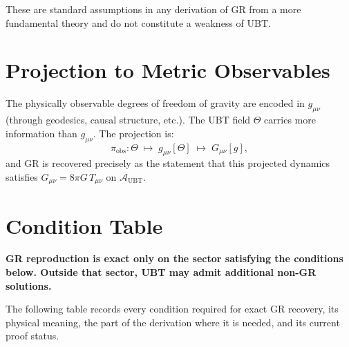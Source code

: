 \documentclass[12pt]{article}
\theoremstyle{definition}
\theoremstyle{remark}
\begin{document}
These are standard assumptions in any derivation of GR from a more
fundamental theory and do not constitute a weakness of UBT.

\section{Projection to Metric Observables}
\label{sec:projection}

The physically observable degrees of freedom of gravity are encoded in
$g_{\mu\nu}$ (through geodesics, causal structure, etc.).  The UBT field
$\Theta$ carries more information than $g_{\mu\nu}$.  The projection is:
\begin{equation}
  \pi_{\text{obs}}: \Theta \;\longmapsto\; g_{\mu\nu}[\Theta]
  \;\longmapsto\; G_{\mu\nu}[g],
\end{equation}
and GR is recovered precisely as the statement that this projected
dynamics satisfies $G_{\mu\nu} = 8\pi G\, T_{\mu\nu}$ on
$\mathcal{A}_{\mathrm{UBT}}$.

\section{Condition Table}
\label{sec:conditions}

\begin{tcolorbox}[colback=gray!5!white,colframe=gray!60!black,
                  title=Mandatory Statement]
\textbf{GR reproduction is exact only on the sector satisfying the conditions
below.  Outside that sector, UBT may admit additional non-GR solutions.}
\end{tcolorbox}

\medskip

\noindent
The following table records every condition required for exact GR recovery,
its physical meaning, the part of the derivation where it is needed, and its
current proof status.

\bigskip
\end{document}
